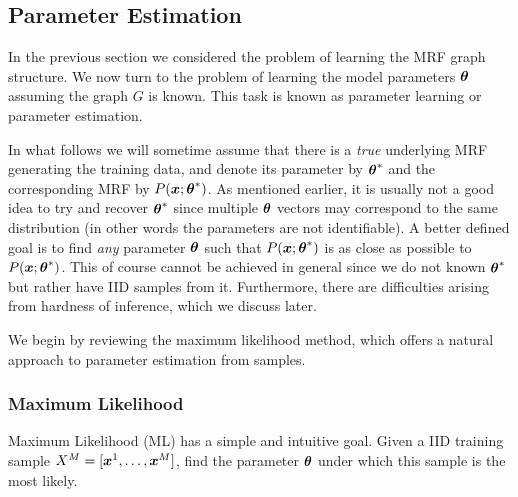 \subsection{Parameter Estimation}
In the previous section we considered the problem of learning the MRF graph structure. We now turn to the problem of learning the model parameters $\boldsymbol{\theta}$ assuming the graph $G$ is known. This task is known as parameter learning or parameter estimation.

In what follows we will sometime assume that there is a {\em true} underlying MRF generating the training data, and denote its parameter by ${\boldsymbol{\theta}}^{*}$ and the corresponding MRF by $P(\boldsymbol{x}; {\boldsymbol{\theta}}^{*})$. As mentioned earlier, it is usually not a good idea to try and recover ${\boldsymbol{\theta}}^{*}$ since multiple $\boldsymbol{\theta}$ vectors may correspond to the same distribution (in other words the parameters are not identifiable). A better defined goal is to find {\em any} parameter $\boldsymbol{\theta}$ such that $P(\boldsymbol{x}; {\boldsymbol{\theta}}^{*})$ is as close as possible to $P(\boldsymbol{x}; {\boldsymbol{\theta}}^{*})$. This of course cannot be achieved in general since we do not known ${\boldsymbol{\theta}}^{*}$  but rather have IID samples from it. Furthermore, there are difficulties arising from hardness of inference, which we discuss later.

We begin by reviewing the maximum likelihood method, which offers a natural approach to parameter estimation from samples.




\subsubsection{Maximum Likelihood}
\label{sec:max_likelihood}
Maximum Likelihood (ML) has a simple and intuitive goal. Given a IID training sample  $X^M = [\boldsymbol{x}^1, \ldots, \boldsymbol{x}^{M}]$, find the parameter $\boldsymbol{\theta}$ under which 
this sample is the most likely. 


